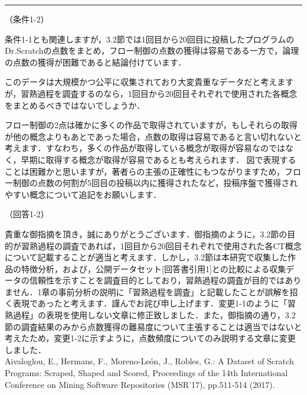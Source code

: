 \documentclass{jarticle} %
\def\subsection#1{ \vspace{1pc} {\gt #1} }
\def\nextans{ \vspace{2pc} \hrule }
\begin{document}
\newpage
\nextans
\subsection{（条件1-2）}

条件1-1とも関連しますが，3.2節では1回目から20回目に投稿したプログラムのDr.Scratchの点数をまとめ，フロー制御の点数の獲得は容易である一方で，論理の点数の獲得が困難であると結論付けています．

このデータは大規模かつ公平に収集されており大変貴重なデータだと考えますが，習熟過程を調査するのなら，1回目から20回目それぞれで使用された各概念をまとめるべきではないでしょうか．

フロー制御の2点は確かに多くの作品で取得されていますが，もしそれらの取得が他の概念よりもあとであった場合，点数の取得は容易であると言い切れないと考えます．すなわち，多くの作品が取得している概念が取得が容易なのではなく，早期に取得する概念が取得が容易であるとも考えられます．
図で表現することは困難かと思いますが，著者らの主張の正確性にもつながりますため，フロー制御の点数の何割が5回目の投稿以内に獲得されたなど，投稿序盤で獲得されやすい概念について追記をお願いします．

\subsection{（回答1-2）}

貴重な御指摘を頂き，誠にありがとうございます．御指摘のように，3.2節の目的が習熟過程の調査であれば，1回目から20回目それぞれで使用された各CT概念について記載することが適当と考えます．しかし，3.2節は本研究で収集した作品の特徴分析，および，公開データセット[回答書引用1]との比較による収集データの信頼性を示すことを調査目的としており，習熟過程の調査が目的ではありません．1章の事前分析の説明に「習熟過程を調査」と記載したことが誤解を招く表現であったと考えます．謹んでお詫び申し上げます．変更1-1のように「習熟過程」の表現を使用しない文章に修正致しました．また，御指摘の通り，3.2節の調査結果のみから点数獲得の難易度について主張することは適当ではないと考えたため，変更1-2に示すように，点数頻度についてのみ説明する文章に変更しました．\\

\noindent[回答書引用1] Aivaloglou, E., Hermans, F., Moreno-Le\'{o}n, J., Robles, G.: A Dataset of Scratch Programs: Scraped, Shaped and Scored, Proceedings of the 14th International Conference on Mining Software Repositories (MSR'17), pp.511-514 (2017).
\end{document}
